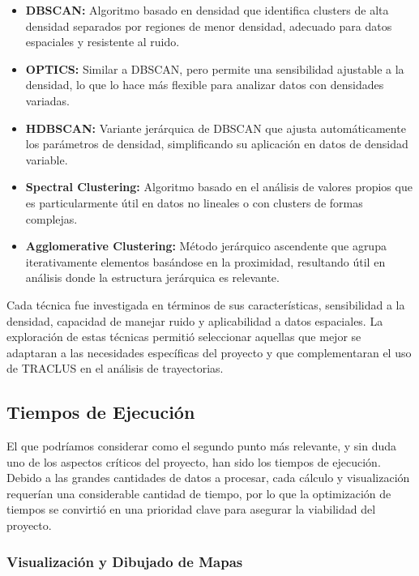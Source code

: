 \begin{itemize}
    \item \textbf{DBSCAN:} Algoritmo basado en densidad que identifica clusters de alta densidad separados por regiones de menor densidad, adecuado para datos espaciales y resistente al ruido.
    
    \item \textbf{OPTICS:} Similar a DBSCAN, pero permite una sensibilidad ajustable a la densidad, lo que lo hace más flexible para analizar datos con densidades variadas.

    \item \textbf{HDBSCAN:} Variante jerárquica de DBSCAN que ajusta automáticamente los parámetros de densidad, simplificando su aplicación en datos de densidad variable.

    \item \textbf{Spectral Clustering:} Algoritmo basado en el análisis de valores propios que es particularmente útil en datos no lineales o con clusters de formas complejas.

    \item \textbf{Agglomerative Clustering:} Método jerárquico ascendente que agrupa iterativamente elementos basándose en la proximidad, resultando útil en análisis donde la estructura jerárquica es relevante.
\end{itemize}

Cada técnica fue investigada en términos de sus características, sensibilidad a la densidad, capacidad de manejar ruido y aplicabilidad a datos espaciales. La exploración de estas técnicas permitió seleccionar aquellas que mejor se adaptaran a las necesidades específicas del proyecto y que complementaran el uso de TRACLUS en el análisis de trayectorias.


\subsection{Tiempos de Ejecución}    

El que podríamos considerar como el segundo punto más relevante, y sin duda uno de los aspectos críticos del proyecto, han sido los tiempos de ejecución. Debido a las grandes cantidades de datos a procesar, cada cálculo y visualización requerían una considerable cantidad de tiempo, por lo que la optimización de tiempos se convirtió en una prioridad clave para asegurar la viabilidad del proyecto.

\subsubsection{Visualización y Dibujado de Mapas}

